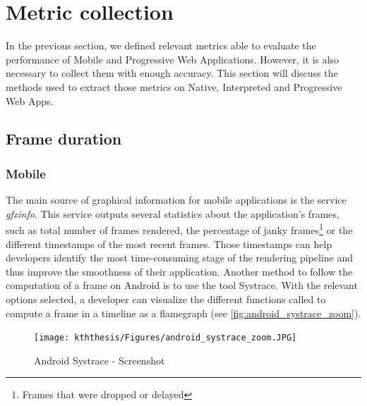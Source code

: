 \documentclass{kththesis}
\begin{document}
\section{Metric collection}

In the previous section, we defined relevant metrics able to evaluate the performance of Mobile and Progressive Web Applications. However, it is also necessary to collect them with enough accuracy. This section will discuss the methods used to extract those metrics on Native, Interpreted and Progressive Web Apps. 
\subsection{Frame duration}
\label{method:smoothness}

\subsubsection{Mobile} \label{collection:android}
    The main source of graphical information for mobile applications is the service \textit{gfxinfo}. This service outputs several statistics about the application's frames, such as total number of frames rendered, the percentage of janky frames\footnote{Frames that were dropped or delayed} or the different timestamps of the most recent frames. Those timestamps can help developers identify the most time-consuming stage of the rendering pipeline and thus improve the smoothness of their application. \newline
    \indent Another method to follow the computation of a frame on Android is to use the tool Systrace. With the relevant options selected, a developer can visualize the different functions called to compute a frame in a timeline as a flamegraph (see \autoref{fig:android_systrace_zoom}).
    
    \begin{figure}
        \centering
        \texttt{[image: kththesis/Figures/android\_systrace\_zoom.JPG]}
        \caption{Android Systrace - Screenshot}
        \label{fig:android_systrace_zoom}
    \end{figure}
    
\end{document}
